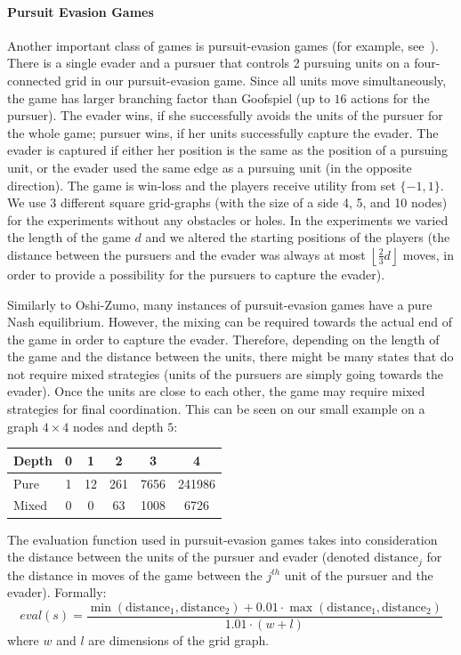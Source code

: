 \paragraph{\textbf{Pursuit Evasion Games}}

Another important class of games is pursuit-evasion games (for example, see~\cite{nguyen2013monte}).
There is a single evader and a pursuer that controls 2 pursuing units on a four-connected grid in our pursuit-evasion game. 
Since all units move simultaneously, the game has larger branching factor than Goofspiel (up to $16$ actions for the pursuer).
The evader wins, if she successfully avoids the units of the pursuer for the whole game; pursuer wins, if her units successfully capture the evader. The evader is captured if either her position is the same as the position of a pursuing unit, or the evader used the same edge as a pursuing unit (in the opposite direction). 
The game is win-loss and the players receive utility from set $\lbrace -1, 1 \rbrace$.
We use $3$ different square grid-graphs (with the size of a side 4, 5, and 10 nodes) for the experiments without any obstacles or holes.
In the experiments we varied the length of the game $d$ and we altered the starting positions of the players (the distance between the pursuers and the evader was always at most $\left\lfloor\frac{2}{3} d\right\rfloor$ moves, in order to provide a possibility for the pursuers to capture the evader).

Similarly to Oshi-Zumo, many instances of pursuit-evasion games have a pure Nash equilibrium.
However, the mixing can be required towards the actual end of the game in order to capture the evader.
Therefore, depending on the length of the game and the distance between the units, there might be many states that do not require mixed strategies (units of the pursuers are simply going towards the evader).
Once the units are close to each other, the game may require mixed strategies for final coordination. 
This can be seen on our small example on a graph $4\times4$ nodes and depth $5$:

\begin{table}[h!]
\centering
\small
\begin{tabular}{|l|c|c|c|c|c|}
\hline Depth & 0 & 1 & 2 & 3 & 4 \\
\hline Pure  & 1 & 12 & 261 & 7656 & 241986 \\
\hline Mixed & 0 & 0 & 63 & 1008 & 6726 \\
\hline
\end{tabular}
\end{table}
The evaluation function used in pursuit-evasion games takes into consideration the distance between the units of the pursuer and evader (denoted $\textrm{distance}_j$ for the distance in moves of the game between the $j^{th}$ unit of the pursuer and the evader). Formally:
$$
eval(s) = \frac{\min(\textrm{distance}_1,\textrm{distance}_2) + 0.01\cdot\max(\textrm{distance}_1,\textrm{distance}_2)}{1.01 \cdot (w+l)}
$$
where $w$ and $l$ are dimensions of the grid graph.

